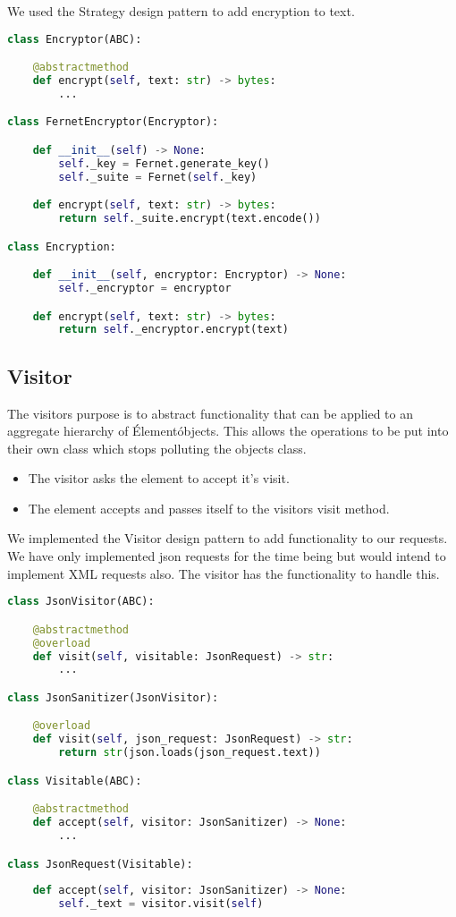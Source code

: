 We used the Strategy design pattern to add encryption to text.


\begin{lstlisting}[language=Python]
class Encryptor(ABC):

	@abstractmethod
	def encrypt(self, text: str) -> bytes:
		...

class FernetEncryptor(Encryptor):

	def __init__(self) -> None:
		self._key = Fernet.generate_key()
		self._suite = Fernet(self._key)

	def encrypt(self, text: str) -> bytes:
		return self._suite.encrypt(text.encode())

class Encryption:

	def __init__(self, encryptor: Encryptor) -> None:
		self._encryptor = encryptor

	def encrypt(self, text: str) -> bytes:
		return self._encryptor.encrypt(text)
\end{lstlisting}

\subsection{Visitor}
The visitors purpose is to abstract functionality that can be applied to an aggregate hierarchy of \'Element\' objects. \cite{sourcemaking} This allows the operations to be put into their own class which stops polluting the objects class.
\begin{itemize}
	\item The visitor asks the element to accept it's visit.
	\item The element accepts and passes itself to the visitors visit method.
\end{itemize}

We implemented the Visitor design pattern to add functionality to our requests. We have only implemented json
requests for the time being but would intend to implement XML requests also. The visitor has the functionality
to handle this.

\begin{lstlisting}[language=Python]
class JsonVisitor(ABC):

	@abstractmethod
	@overload
	def visit(self, visitable: JsonRequest) -> str:
		...

class JsonSanitizer(JsonVisitor):

	@overload
	def visit(self, json_request: JsonRequest) -> str:
		return str(json.loads(json_request.text))

class Visitable(ABC):

	@abstractmethod
	def accept(self, visitor: JsonSanitizer) -> None:
		...

class JsonRequest(Visitable):
	
	def accept(self, visitor: JsonSanitizer) -> None:
		self._text = visitor.visit(self)

\end{lstlisting}

